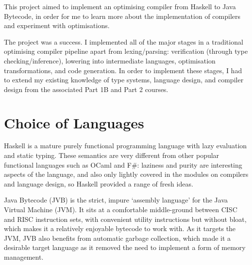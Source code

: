 \documentclass[dissertation.tex]{subfiles}
\begin{document}
This project aimed to implement an optimising compiler from Haskell to Java Bytecode, in order for me to learn more about the implementation of compilers and experiment with optimisations.


The project was a success. I implemented all of the major stages in a traditional optimising compiler pipeline apart from lexing/parsing: verification (through type checking/inference), lowering into intermediate languages, optimisation transformations, and code generation. In order to implement these stages, I had to extend my existing knowledge of type systems, language design, and compiler design from the associated Part 1B and Part 2 courses. 

\section{Choice of Languages}
{
    Haskell is a mature purely functional programming language with lazy evaluation and static typing. These semantics are very different from other popular functional languages such as OCaml and F\#: laziness and purity are interesting aspects of the language, and also only lightly covered in the modules on compilers and language design, so Haskell provided a range of fresh ideas.

    Java Bytecode (JVB) is the strict, impure `assembly language' for the Java Virtual Machine (JVM). It sits at a comfortable middle-ground between CISC and RISC instruction sets, with convenient utility instructions but without bloat, which makes it a relatively enjoyable bytecode to work with. As it targets the JVM, JVB also benefits from automatic garbage collection, which made it a desirable target language as it removed the need to implement a form of memory management.
}
\end{document}
